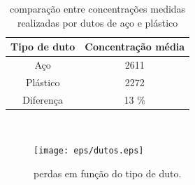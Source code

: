 \begin{table}[!htbp]
\centering \caption{\label{perdas} compara\c{c}\~{a}o entre concentra\c{c}\~{o}es medidas realizadas por dutos de a\c{c}o e pl\'{a}stico}
\begin{tabular}{ c | c  }
  \hline
  Tipo de duto & Concentra\c{c}\~{a}o m\'{e}dia\\
  \hline
  A\c{c}o & 2611\\
  Pl\'{a}stico & 2272\\
  \hline
  Diferen\c{c}a & 13 \% \\
  \hline
\end{tabular}\\
\end{table}



\begin{figure}[hbt]
\begin{center}
\texttt{[image: eps/dutos.eps]}\\
\end{center}
\caption{\label{duto}\hspace{-0.1em} perdas em fun\c{c}\~{a}o do tipo de duto. }
\end{figure}




